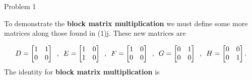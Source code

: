 \begin{problem}{Problem 1}
\begin{highlight}[Solution]
        To demonstrate the \textbf{block matrix multiplication} we must define some more matrices along those found in (1)j. These new matrices are 

        \begin{equation}
            D = 
            \begin{bmatrix}
                1 & 1 \\
                0 & 0 \\
            \end{bmatrix}
            \hspace*{5pt} , \hspace*{5pt}
            E = 
            \begin{bmatrix}
                1 & 0 \\
                1 & 0 \\
            \end{bmatrix}
            \hspace*{5pt} , \hspace*{5pt}
            F = 
            \begin{bmatrix}
                1 & 0 \\
                0 & 0 \\
            \end{bmatrix}
            \hspace*{5pt} , \hspace*{5pt}
            G = 
            \begin{bmatrix}
                0 & 1 \\
                0 & 0 \\
            \end{bmatrix}
            \hspace*{5pt} , \hspace*{5pt}
            H = 
            \begin{bmatrix}
                0 & 0 \\
                0 & 1 \\
            \end{bmatrix}.
        \end{equation}
        The identity for \textbf{block matrix multiplication} is 


\end{highlight}
\end{problem}
